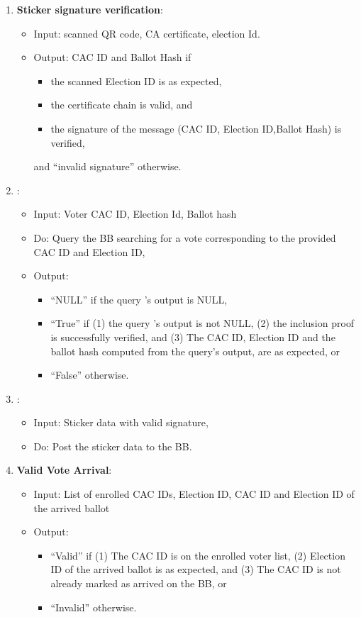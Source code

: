 \documentclass{article}
\begin{document}
\begin{enumerate}
    \item \textbf{Sticker signature verification}:
\begin{itemize}
    \item Input: scanned QR code,  CA certificate, election Id.
    \item Output: CAC ID and Ballot Hash if 
    \begin{itemize}
        \item the scanned Election ID is as expected, 
        \item the certificate chain is valid, and
        \item the signature of the message (CAC ID, Election ID,Ballot Hash) is verified,
    \end{itemize}
    and ``invalid signature'' otherwise.
\end{itemize}
\label{Sticker signature verification}
    \item \textbf{\BBInclusionCheck{}}:

\begin{itemize}
    \item    Input: Voter CAC ID, Election Id, Ballot hash
    \item     Do: Query the BB  searching for a vote corresponding to the provided CAC ID and Election ID,
    \item Output: 
    \begin{itemize}
        \item ``NULL'' if the query 's output is NULL,
        \item ``True'' if (1) the query 's output is not NULL, (2) the inclusion proof is successfully verified, and
        (3) The CAC ID, Election ID and the ballot hash computed from the query's output, are as expected, or
        \item ``False'' otherwise.
    \end{itemize}


\end{itemize}
\label{Vote BB presence-BB Inc}
    \item \textbf{\StickerBBUpload{}}:
\begin{itemize}
    \item Input: Sticker data with valid signature,
    \item Do: Post the sticker data to the BB.
\end{itemize}
\label{Vote BB presence-upload}

    \item \textbf{Valid Vote Arrival}:
\begin{itemize}
    \item Input: List of enrolled CAC IDs, Election ID, CAC ID and Election ID of the arrived ballot
    \item Output: 
    \begin{itemize}
        \item ``Valid'' if     (1) The CAC ID is on the enrolled voter list, (2) Election ID of the arrived ballot is as expected, and (3) The CAC ID is not already marked as arrived on the BB, or
        \item ``Invalid'' otherwise.


\end{itemize}
\end{itemize}
\end{enumerate}
\end{document}
